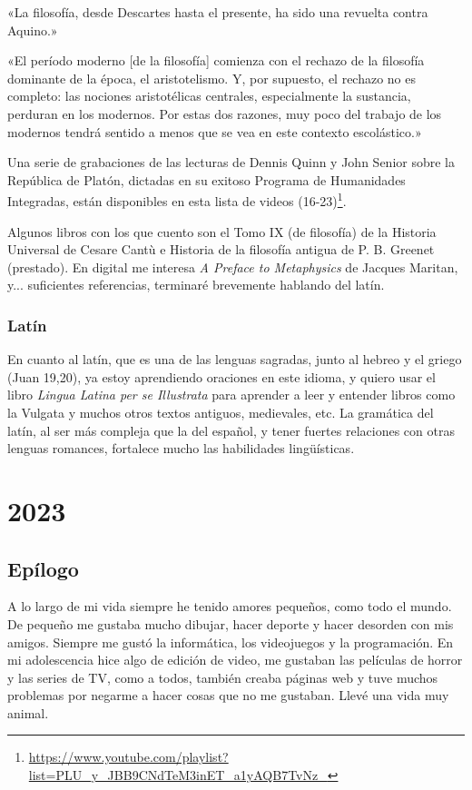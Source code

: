 \documentclass[12pt]{article}
\begin{document}
«La filosofía, desde Descartes hasta el presente, ha sido una revuelta contra
Aquino.»

«El período moderno [de la filosofía] comienza con el rechazo de la filosofía
dominante de la época, el aristotelismo. Y, por supuesto, el rechazo no es
completo: las nociones aristotélicas centrales, especialmente la sustancia,
perduran en los modernos. Por estas dos razones, muy poco del trabajo de los
modernos tendrá sentido a menos que se vea en este contexto escolástico.»

Una serie de grabaciones de las lecturas de Dennis Quinn y John Senior sobre la
República de Platón, dictadas en su exitoso Programa de Humanidades Integradas,
están disponibles en esta lista de videos
(16-23)\footnote{\url{https://www.youtube.com/playlist?list=PLU_y_JBB9CNdTeM3inET_a1yAQB7TvNz_}}.

Algunos libros con los que cuento son el Tomo IX (de filosofía) de la Historia
Universal de Cesare Cantù e Historia de la filosofía antigua de P. B. Greenet
(prestado). En digital me interesa \textit{A Preface to Metaphysics} de Jacques
Maritan,
y... suficientes referencias, terminaré brevemente hablando del
latín.

\subsubsection*{Latín}

En cuanto al latín, que es una de las lenguas sagradas, junto al hebreo y el
griego (Juan 19,20), ya estoy aprendiendo oraciones en este idioma, y quiero
usar el libro \textit{Lingua Latina per se Illustrata} para aprender a leer y
entender
libros como la Vulgata y muchos otros textos antiguos, medievales, etc. La
gramática del latín, al ser más compleja que la del español, y tener fuertes
relaciones con otras lenguas romances, fortalece mucho las habilidades
lingüísticas.

\newpage
\section{2023}

\subsection{Epílogo}

A lo largo de mi vida siempre he tenido amores pequeños, como todo el mundo. De
pequeño me gustaba mucho dibujar, hacer deporte y hacer desorden con mis amigos.
Siempre me gustó la informática, los videojuegos y la programación. En mi
adolescencia
hice algo de edición de video, me gustaban las películas de horror y las series
de TV, como a todos, también creaba páginas web y tuve muchos problemas por
negarme a hacer cosas que no me gustaban. Llevé una vida muy animal.
\end{document}
